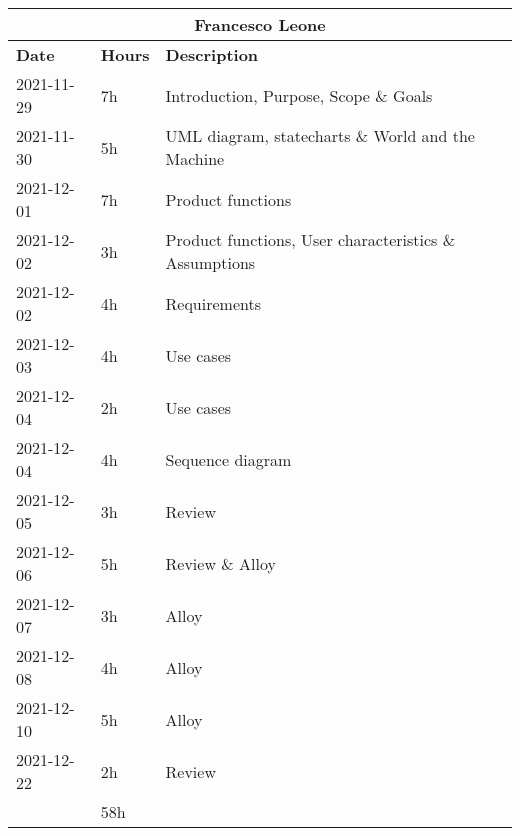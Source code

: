 \newpage
\begin{table}[H]
    \centering
    \begin{tabular}{|l|l|l|}
        \multicolumn{3}{c}{\textbf{Francesco Leone}}                      \\
        \hline
        \textbf{Date} & \textbf{Hours} & \textbf{Description}              \\\hline
        2021-11-29    & 7h             & Introduction, Purpose, Scope \& Goals                  \\\hline
        2021-11-30    & 5h             & UML diagram, statecharts \& World and the Machine      \\\hline
        2021-12-01    & 7h             & Product functions                                      \\\hline
        2021-12-02    & 3h             & Product functions, User characteristics \& Assumptions \\\hline
        2021-12-02    & 4h             & Requirements                                           \\\hline
        2021-12-03    & 4h             & Use cases                                              \\\hline
        2021-12-04    & 2h             & Use cases                                              \\\hline
        2021-12-04    & 4h             & Sequence diagram                                       \\\hline
        2021-12-05    & 3h             & Review                                                 \\\hline
        2021-12-06    & 5h             & Review \& Alloy                                        \\\hline
        2021-12-07    & 3h             & Alloy                                                  \\\hline
        2021-12-08    & 4h             & Alloy                                                  \\\hline
        2021-12-10    & 5h             & Alloy                                                  \\\hline
        2021-12-22    & 2h             & Review                                                 \\\hline\hline
                      & 58h            &                                                        \\\hline
    \end{tabular}
\end{table}